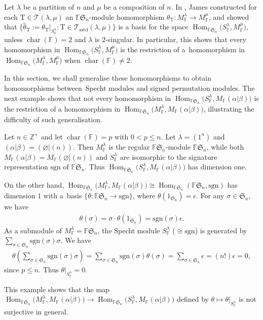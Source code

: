 \documentclass[11pt]{article}
\newcommand{\TT}{\mathscr{T}}
\newcommand{\TTS}{\mathscr{T}_\mathrm{sstd}}
\newcommand{\T}{\mathrm{T}}
\newcommand{\sgn}{\mathrm{sgn}}
\newcommand{\Char}{\operatorname{\mathrm{char}}}
\newcommand{\Hom}{\operatorname{Hom}}
\newcommand{\sym}[1]{\mathfrak{S}_{#1}}
\newcommand{\F}{\mathbb{F}}
\begin{document}
Let $\lambda$ be a partition of $n$ and $\mu$ be a composition of $n$. In \cite[Section~13]{GJ}, James constructed for each $\T \in \TT(\lambda,\mu)$ an $\F\sym{n}$-module homomorphism $\theta_\T \colon M_\F^{\lambda} \to M_\F^{\mu}$, and showed that $\{ \hat{\theta}_{\T} := \theta_{\T}|_{S_\F^{\lambda}}\colon \T \in \TTS(\lambda,\mu) \}$ is a basis for the space $\Hom_{\F\sym{n}}\big(S_\F^{\lambda},M_\F^{\mu}\big)$, unless $\Char(\F)=2$ and $\lambda$ is $2$-singular. In particular, this shows that every homomorphism in $\Hom_{\F\sym{n}}\big(S_\F^{\lambda},M_\F^{\mu}\big)$ is the restriction of a~homomorphism in $\Hom_{\F\sym{n}}\big(M_\F^{\lambda},M_\F^{\mu}\big)$ when $\Char(\F)\neq 2$.

In this section, we shall generalise these homomorphisms to obtain homomorphisms between~Specht modules and signed permutation modules. The next example shows that not every homomor\-phism in $\Hom_{\F\sym{n}}\big(S_\F^{\lambda},M_\F(\alpha|\beta)\big)$ is the restriction of a homomorphism in \linebreak $\Hom_{\F\sym{n}}\big(M_\F^{\lambda},M_\F(\alpha|\beta)\big)$, illustrating the difficulty of such generalisation.

\begin{Example}\label{Eg: James res}
Let $n\in \mathbb{Z}^+$ and let $\Char(\F)=p$ with $0 < p \leq n$. Let $\lambda=(1^n)$ and $(\alpha|\beta)=(\varnothing|(n))$. Then $M_\F^\lambda$ is the regular $\F\sym{n}$-module $\F\sym{n}$, while both $M_\F(\alpha|\beta)=M_\F(\varnothing|(n))$ and $S_\F^\lambda$ are isomorphic to the signature representation $\sgn$ of $\F\sym{n}$. Thus $\Hom_{\F\sym{n}}\big(S_\F^\lambda,M_\F(\alpha|\beta)\big)$ has dimension one.

On the other hand, $\Hom_{\F\sym{n}}\big(M_\F^\lambda,M_\F(\alpha|\beta)\big) \cong \Hom_{\F\sym{n}}(\F\sym{n},\sgn)$ has dimension $1$ with a~basis $\{\theta\colon \F\sym{n} \to \sgn \}$, where $\theta(1_{\sym{n}})=\epsilon$. For any $\sigma\in \sym{n}$, we have
\begin{gather*}
\theta(\sigma)=\sigma \cdot \theta(1_{\sym{n}})=\sgn(\sigma) \epsilon.
\end{gather*}
As a submodule of $M_\F^{\lambda} = \F\sym{n}$, the Specht module $S_\F^{\lambda}$ ($\cong \sgn$) is generated by $\sum\limits_{\sigma \in \sym{n}} \sgn(\sigma) \sigma$. We have
\begin{gather*}
\theta\left (\sum_{\sigma\in\sym{n}}\sgn(\sigma)\sigma\right )=\sum_{\sigma\in\sym{n}}\sgn(\sigma)\theta(\sigma)=\sum_{\sigma\in\sym{n}} \epsilon = (n!) \epsilon = 0,
\end{gather*}
since $p \leq n$. Thus $\theta|_{S_\F^\lambda} = 0$.

This example shows that the map $\Hom_{\F\sym{n}} \big(M_\F^{\lambda}, M_\F(\alpha|\beta)\big) \to \Hom_{\F\sym{n}} \big(S_\F^{\lambda}, M_\F(\alpha|\beta)\big)$ defined by $\theta \mapsto \theta|_{S_\F^{\lambda}}$ is not surjective in general.
\end{Example}
\end{document}
